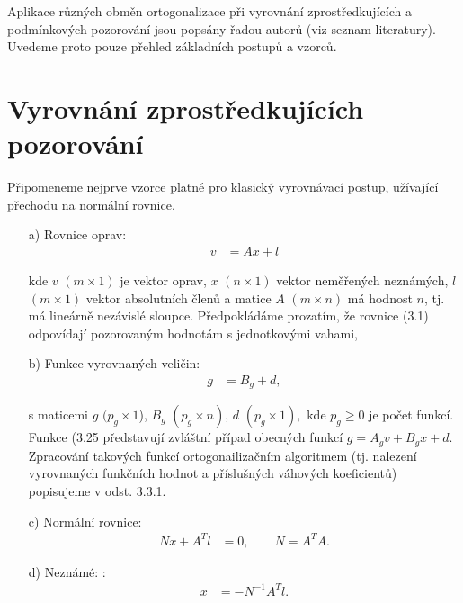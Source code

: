 
Aplikace  různých obměn  ortogonalizace
při vyrovnání zprostředkujících a podmínkových pozorování jsou popsány
řadou autorů (viz seznam literatury). Uvedeme proto pouze přehled
základních postupů a vzorců.



\section{Vyrovnání zprostředkujících pozorování}

Připomeneme nejprve vzorce platné pro klasický vyrovnávací
postup, užívající přechodu na normální rovnice.

\begin{itemize}

\setlength{\abovedisplayskip}{0pt}
\setlength{\belowdisplayskip}{0pt}

\item[a)] Rovnice oprav:
%
\begin{align*}
\tag{3.1}   v &= Ax+l
\end{align*}

kde $v$ $(m \times 1)$ je vektor oprav, $x$ $(n \times 1)$ vektor
neměřených neznámých, $l$ $(m \times 1)$ vektor absolutních členů a
matice $A$ $(m\times n)$ má hodnost $n$, tj. má lineárně nezávislé
sloupce. Předpokládáme prozatím, že rovnice (3.1) odpovídají
pozorovaným hodnotám s jednotkovými vahami,

\item[b)] Funkce vyrovnaných veličin:
%
\begin{align*}
\tag{3.2} g &= B_g + d,
\end{align*}

s maticemi $g$ $(p_g \times 1$), $B_g$ $(p_g \times n)$, $d$
$(p_g \times 1),$ kde $p_g \ge 0$ je počet funkcí. Funkce (3.25
představují zvláštní případ obecných funkcí
%
$g = A_g v + B_g x + d.$
%
Zpracování takových funkcí ortogonailizačním algoritmem
(tj. nalezení vyrovnaných funkčních hodnot a příslušných váhových
koeficientů) popisujeme v odst. 3.3.1.

\item[c)] Normální rovnice:
%
\begin{align*}
\tag{3.3}   Nx + A^Tl &= 0, \qquad N = A^TA.
\end{align*}

\item[d)] Neznámé: :
%
\begin{align*}
\tag{3.4}   x &= -N^{-1}A^Tl.
\end{align*}



\end{itemize}
